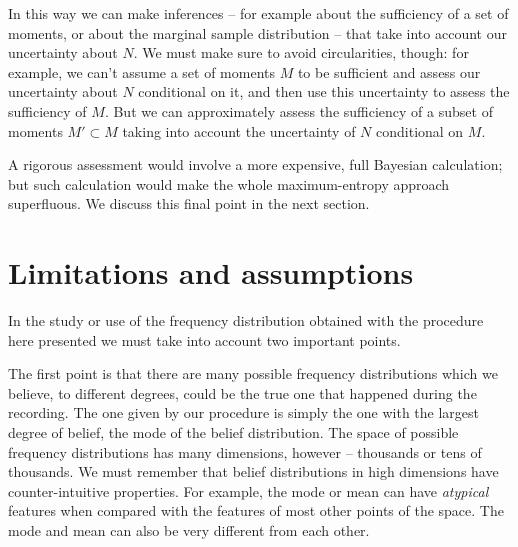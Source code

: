 \documentclass[\ifafour a4paper,12pt,\else a5paper,10pt,\fi%
onecolumn,oneside,article,%
british%
]{memoir}
\theoremstyle{remark}
\theoremstyle{innote}
\renewcommand*{\|}{\nonscript\,\vert\nonscript\;\mathopen{}}
\begin{document}
\bigskip

In this way we can make inferences -- for example about the sufficiency of
a set of moments, or about the marginal sample distribution -- that take
into account our uncertainty about $N$. We must make sure to avoid
circularities, though: for example, we can't assume a set of moments $M$ to
be sufficient and assess our uncertainty about $N$ conditional on it, and
then use this uncertainty to assess the sufficiency of $M$. But we can
approximately assess the sufficiency of a subset of moments $M' \subset M$
taking into account the uncertainty of $N$ conditional on $M$.

A rigorous assessment would involve a more expensive, full Bayesian
calculation; but such calculation would make the whole maximum-entropy
approach superfluous. We discuss this final point in the next section.


\section{Limitations and assumptions}
\label{sec:assumptions}

In the study or use of the frequency distribution obtained with the
procedure here presented we must take into account two important points.

The first point is that there are many possible frequency distributions
which we believe, to different degrees, could be the true one that happened
during the recording. The one given by our procedure is simply the one with
the largest degree of belief, the mode of the belief distribution. The
space of possible frequency distributions has many dimensions, however --
thousands or tens of thousands. We must remember that belief distributions
in high dimensions have counter-intuitive properties. For example, the mode
or mean can have \emph{atypical} features when compared with the features
of most other points of the space. The mode and mean can also be very
different from each other.
\end{document}
